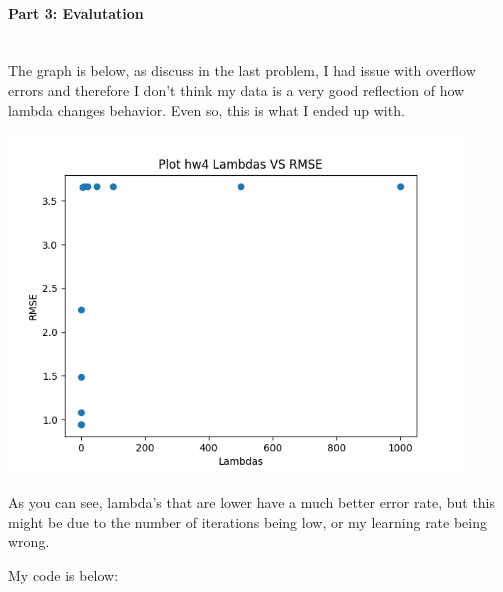\documentclass[12pt]{article}
\begin{document}
    \paragraph{Part 3: Evalutation}~\\
    The graph is below, as discuss in the last problem, I had issue with overflow errors and therefore I don't think
    my data is a very good reflection of how lambda changes behavior. Even so, this is what I ended up with.
    \begin{center}
    \includegraphics[width=12cm]{hw4_part3.png}
    \end{center}
    As you can see, lambda's that are lower have a much better error rate, but this might be due to the number of iterations 
    being low, or my learning rate being wrong.

    My code is below:
    \inputminted{python}{Szemis_hw4.py}
\end{document}
